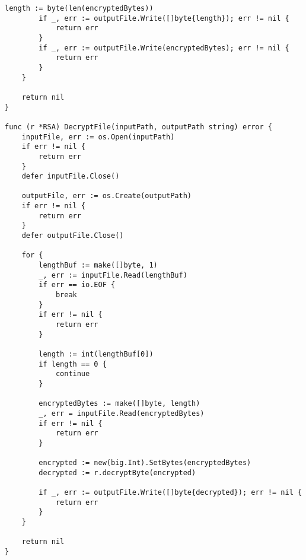 \begin{lstlisting}[style=golang, caption={Реализация алгоритма шифрования и расшифровки с открытым ключом файла}, label=lst:codegolang]
		length := byte(len(encryptedBytes))
		if _, err := outputFile.Write([]byte{length}); err != nil {
			return err
		}
		if _, err := outputFile.Write(encryptedBytes); err != nil {
			return err
		}
	}
	
	return nil
}

func (r *RSA) DecryptFile(inputPath, outputPath string) error {
	inputFile, err := os.Open(inputPath)
	if err != nil {
		return err
	}
	defer inputFile.Close()
	
	outputFile, err := os.Create(outputPath)
	if err != nil {
		return err
	}
	defer outputFile.Close()
	
	for {
		lengthBuf := make([]byte, 1)
		_, err := inputFile.Read(lengthBuf)
		if err == io.EOF {
			break
		}
		if err != nil {
			return err
		}
		
		length := int(lengthBuf[0])
		if length == 0 {
			continue
		}
		
		encryptedBytes := make([]byte, length)
		_, err = inputFile.Read(encryptedBytes)
		if err != nil {
			return err
		}
		
		encrypted := new(big.Int).SetBytes(encryptedBytes)
		decrypted := r.decryptByte(encrypted)
		
		if _, err := outputFile.Write([]byte{decrypted}); err != nil {
			return err
		}
	}
	
	return nil
}

\end{lstlisting}


